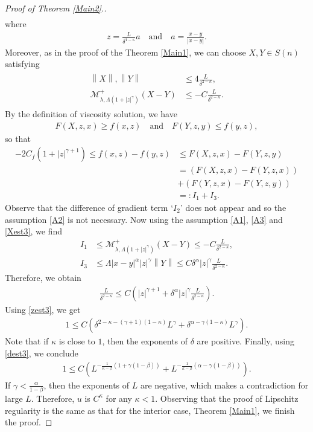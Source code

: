 \documentclass[reqno]{amsart}
\theoremstyle{plain}
\theoremstyle{definition}
\theoremstyle{remark}
\newcommand{\norm}[1]{\left\lVert#1\right\rVert}
\numberwithin{equation}{section}
\begin{document}
\begin{proof}[Proof of Theorem \ref{Main2}.]
\begin{align*}
\end{align*}
where
\begin{align} \label{zest3}
     z= \frac{L}{\delta^{1-\kappa}} a \quad \text{and} \quad a= \frac{x-y}{|x-y|}.
\end{align}
Moreover, as in the proof of the Theorem \ref{Main1}, we can choose $X,Y \in S(n)$ satisfying
\begin{align} \label{Xest3}
\begin{split}
    \norm{X}, \norm{Y} &\leq 4\frac{L}{\delta^{2-\kappa}}, \\
    \mathcal{M}^+_{\lambda, \Lambda(1+|z|^{\gamma})}(X-Y) &\leq -C\frac{L}{\delta^{2-\kappa}}.
\end{split}
\end{align}
By the definition of viscosity solution, we have
\begin{align*}
    F(X, z, x) \geq f(x,z) \quad \text{and} \quad F(Y, z, y) \leq f(y,z),
\end{align*}
so that
\begin{align*}
    -2C_f(1+|z|^{\gamma+1}) \leq f(x,z)-f(y,z) &\leq F(X, z, x) -F(Y, z, y) \\
        &=(F(X ,z, x) - F(Y, z, x)) \\
        &+ (F(Y, z, x) - F(Y, z, y)) \\
        &=:I_1 + I_3.
\end{align*}
Observe that the difference of gradient term `$I_2$' does not appear and so the assumption \ref{A2}  is not necessary.
Now using the assumption \ref{A1}, \ref{A3} and \eqref{Xest3}, we find
\begin{align*}
    I_1 &\leq \mathcal{M}^+_{\lambda, \Lambda(1+|z|^{\gamma})}(X-Y) \leq -C \frac{L}{\delta^{2-\kappa}}, \\
    I_3 &\leq \Lambda|x-y|^\alpha |z|^\gamma \norm{Y} \leq C\delta^\alpha|z|^\gamma\frac{L}{\delta^{2-\kappa}}.
\end{align*}
Therefore, we obtain
\begin{align*}
    \frac{L}{\delta^{2-\kappa}} \leq C \left( |z|^{\gamma+1} + \delta^\alpha|z|^\gamma\frac{L}{\delta^{2-\kappa}} \right).
\end{align*}
Using \eqref{zest3}, we get
\begin{align*}
    1 \leq C\left( \delta^{2-\kappa-(\gamma+1)(1-\kappa)}L^{\gamma} +\delta^{\alpha - \gamma(1-\kappa)}L^\gamma\right).
\end{align*}
Note that if $\kappa$ is close to $1$, then the exponents of $\delta$ are positive.
Finally, using \eqref{dest3}, we conclude
\begin{align*}
    1 \leq C \left( L^{-\frac{1}{\kappa-\beta}(1+\gamma(1-\beta))} + L^{-\frac{1}{\kappa-\beta}(\alpha-\gamma(1-\beta))} \right).
\end{align*}
If $\gamma < \frac{\alpha}{1-\beta}$, then the exponents of $L$ are negative, which makes a contradiction for large $L$.
Therefore, $u$ is $C^\kappa$ for any $\kappa<1$.
Observing that the proof of Lipschitz regularity is the same as that for the interior case, Theorem \ref{Main1}, we finish the proof.
\end{proof}
\end{document}

